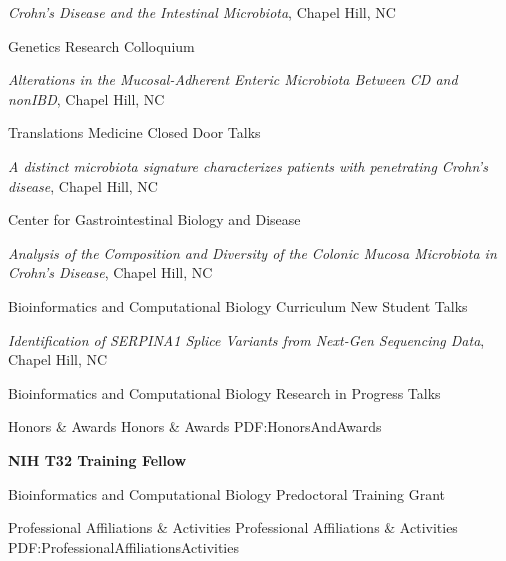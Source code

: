 \documentclass[letterpaper,MMMyyyy,nonstopmode]{simpleresumecv}
\begin{document}
\begin{Body}
\BulletItem
\textit{Crohn’s Disease and the Intestinal Microbiota},
Chapel Hill, NC
\hfill
{} 
\begin{Detail}
\Item
Genetics Research Colloquium
\end{Detail}

\BulletItem
\textit{Alterations in the Mucosal-Adherent Enteric Microbiota Between CD and nonIBD},
Chapel Hill, NC
\hfill
{} 
\begin{Detail}
\Item
Translations Medicine Closed Door Talks
\end{Detail}

\BulletItem
\textit{A distinct microbiota signature characterizes patients with penetrating Crohn’s disease},
Chapel Hill, NC
\hfill
{} 
\begin{Detail}
\Item
Center for Gastrointestinal Biology and Disease
\end{Detail}

\BulletItem
\textit{Analysis of the Composition and Diversity of the Colonic Mucosa Microbiota in Crohn’s
Disease},
Chapel Hill, NC
\hfill
{} 
\begin{Detail}
\Item
Bioinformatics and Computational Biology Curriculum New Student Talks
\end{Detail}

\BulletItem
\textit{Identification of SERPINA1 Splice Variants from Next-Gen Sequencing Data},
Chapel Hill, NC
\hfill
{} 
\begin{Detail}
\Item
Bioinformatics and Computational Biology Research in Progress Talks
\end{Detail}

\Section
{Honors \&\newline
Awards}
{Honors \& Awards}
{PDF:HonorsAndAwards}

\BulletItem
\textbf{NIH T32 Training Fellow}
\hfill
{}
\begin{Detail}
\Item
Bioinformatics and Computational Biology Predoctoral Training Grant
\end{Detail}




\Section
{Professional Affiliations\newline
\& Activities}
{Professional Affiliations \& Activities}
{PDF:ProfessionalAffiliationsActivities}


\end{Body}
\end{document}
